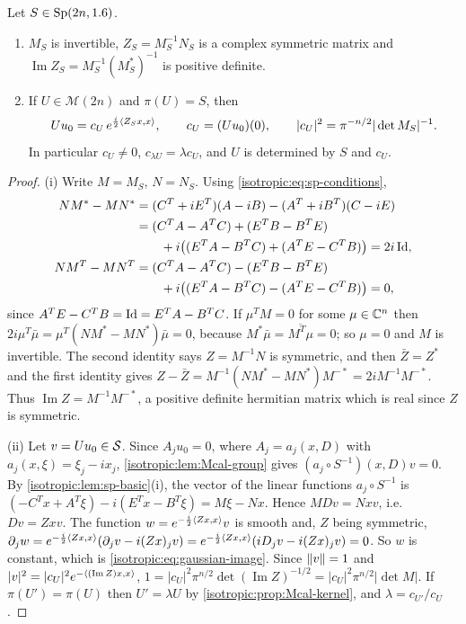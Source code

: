 \begin{lemma}\label{isotropic:lem:gaussian}
Let $S\in\mathrm{Sp}(2n,1.6)$.
\begin{enumerate}[label=\textup{(\roman*)}]
\item $M_S$ is invertible, $Z_S=M_S^{-1}N_S$ is a complex symmetric matrix and
  $\operatorname{Im}Z_S=M_S^{-1}(M_S^*)^{-1}$ is positive definite.
\item If $U\in\mathcal M(2n)$ and $\pi(U)=S$, then
  \begin{equation}\label{isotropic:eq:gaussian-image}
    Uu_0=c_U\,e^{\frac i2\langle Z_Sx, x\rangle},\qquad c_U=(Uu_0)(0),\qquad
    |c_U|^2=\pi^{-n/2}|\det M_S|^{-1}.
  \end{equation}
  In particular $c_U\ne0$, $c_{\lambda U}=\lambda c_U$, and $U$ is determined
  by $S$ and $c_U$.
\end{enumerate}
\end{lemma}
\begin{proof}
(i) Write $M=M_S$, $N=N_S$. Using \eqref{isotropic:eq:sp-conditions},
\begin{align*}
  NM^*-MN^*&=(C^T+iE^T)(A-iB)-(A^T+iB^T)(C-iE)\\
  &=(C^TA-A^TC)+(E^TB-B^TE)\\
  &\qquad+i\bigl((E^TA-B^TC)+(A^TE-C^TB)\bigr)=2i\operatorname{Id},\\
  NM^T-MN^T&=(C^TA-A^TC)-(E^TB-B^TE)\\
  &\qquad+i\bigl((E^TA-B^TC)-(A^TE-C^TB)\bigr)=0,
\end{align*}
since $A^TE-C^TB=\operatorname{Id}=E^TA-B^TC$. If $\mu^TM=0$ for some $\mu\in\mathbb{C}^n$ then
$2i\mu^T\bar\mu=\mu^T(NM^*-MN^*)\bar\mu=0$, because $M^*\bar\mu=\overline{M^T\mu}=0$;
so $\mu=0$ and $M$ is invertible. The second identity says $Z=M^{-1}N$ is
symmetric, and then $\bar Z=Z^*$ and the first identity gives
$Z-\bar Z=M^{-1}(NM^*-MN^*)M^{-*}=2iM^{-1}M^{-*}$. Thus
$\operatorname{Im}Z=M^{-1}M^{-*}$, a positive definite hermitian matrix which is
real since $Z$ is symmetric.

(ii) Let $v=Uu_0\in\mathcal{S}$. Since $A_ju_0=0$, where $A_j=a_j(x,D)$ with
$a_j(x,\xi)=\xi_j-ix_j$, \cref{isotropic:lem:Mcal-group} gives
$(a_j\circ S^{-1})(x,D)v=0$. By \cref{isotropic:lem:sp-basic}(i), the vector of
the linear functions $a_j\circ S^{-1}$ is
$(-C^Tx+A^T\xi)-i(E^Tx-B^T\xi)=M\xi-Nx$. Hence $MDv=Nxv$, i.e.\ $Dv=Zxv$. The
function $w=e^{-\frac i2\langle Zx, x\rangle}v$ is smooth and, $Z$ being symmetric,
$\partial_jw=e^{-\frac i2\langle Zx, x\rangle}(\partial_jv-i(Zx)_jv)=e^{-\frac i2\langle Zx, x\rangle}(iD_jv-i(Zx)_jv)=0$.
So $w$ is constant, which is \eqref{isotropic:eq:gaussian-image}. Since
$\lVert v\rVert=1$ and $|v|^2=|c_U|^2e^{-\langle (\operatorname{Im}Z)x, x\rangle}$,
$1=|c_U|^2\pi^{n/2}\det(\operatorname{Im}Z)^{-1/2}=|c_U|^2\pi^{n/2}|\det M|$. If
$\pi(U')=\pi(U)$ then $U'=\lambda U$ by \cref{isotropic:prop:Mcal-kernel}, and
$\lambda=c_{U'}/c_U$.
\end{proof}

